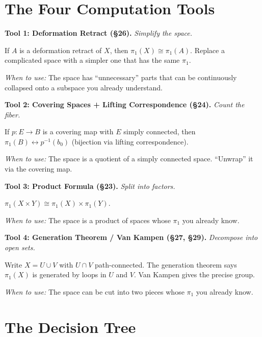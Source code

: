 \documentclass[11pt]{report}
\begin{document}
\section{The Four Computation Tools}

\textbf{Tool 1: Deformation Retract (\S 26).} \textit{Simplify the space.}

If $A$ is a deformation retract of $X$, then $\pi_1(X) \cong \pi_1(A)$. Replace a complicated space with a simpler one that has the same $\pi_1$.

\textit{When to use:} The space has ``unnecessary'' parts that can be continuously collapsed onto a subspace you already understand.

\medskip

\textbf{Tool 2: Covering Spaces + Lifting Correspondence (\S 24).} \textit{Count the fiber.}

If $p: E \to B$ is a covering map with $E$ simply connected, then $\pi_1(B) \leftrightarrow p^{-1}(b_0)$ (bijection via lifting correspondence).

\textit{When to use:} The space is a quotient of a simply connected space. ``Unwrap'' it via the covering map.

\medskip

\textbf{Tool 3: Product Formula (\S 23).} \textit{Split into factors.}

$\pi_1(X \times Y) \cong \pi_1(X) \times \pi_1(Y)$.

\textit{When to use:} The space is a product of spaces whose $\pi_1$ you already know.

\medskip

\textbf{Tool 4: Generation Theorem / Van Kampen (\S 27, \S 29).} \textit{Decompose into open sets.}

Write $X = U \cup V$ with $U \cap V$ path-connected. The generation theorem says $\pi_1(X)$ is generated by loops in $U$ and $V$. Van Kampen gives the precise group.

\textit{When to use:} The space can be cut into two pieces whose $\pi_1$ you already know.

\section{The Decision Tree}
\end{document}
